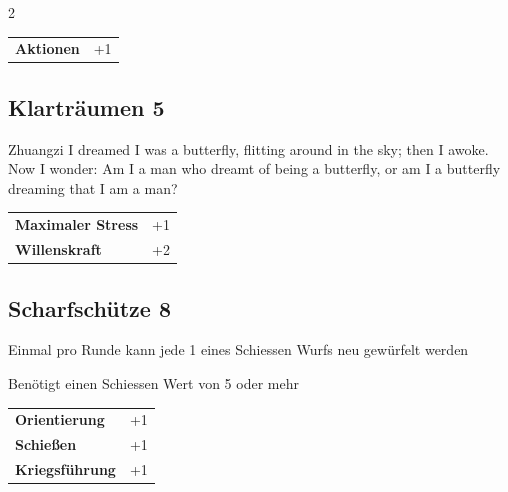 \begin{multicols}{2}
\begin{tcolorbox}
\vspace{3mm}

\begin{tabular}{@{}ll@{}}
    \textbf{Aktionen} & +1\\
\end{tabular}


\end{tcolorbox}

\begin{tcolorbox}
    \subsection*{Klarträumen \hfill \small{5 }}
    \tcblower


\begin{pquote}{Zhuangzi}
I dreamed I was a butterfly, flitting around in the sky; then I awoke. Now I wonder: Am I a man who dreamt of being a butterfly, or am I a butterfly dreaming that I am a man?
\end{pquote}

\vspace{3mm}

\begin{tabular}{@{}ll@{}}
    \textbf{Maximaler Stress} & +1\\
    \textbf{Willenskraft} & +2\\
\end{tabular}


\end{tcolorbox}

\begin{tcolorbox}
    \subsection*{Scharfschütze \hfill \small{8 }}
    \tcblower
Einmal pro Runde kann jede 1 eines Schiessen Wurfs neu gewürfelt werden

Benötigt einen Schiessen Wert von 5 oder mehr


\vspace{3mm}

\begin{tabular}{@{}ll@{}}
    \textbf{Orientierung} & +1\\
    \textbf{Schießen} & +1\\
    \textbf{Kriegsführung} & +1\\
\end{tabular}


\end{tcolorbox}
\end{multicols}

